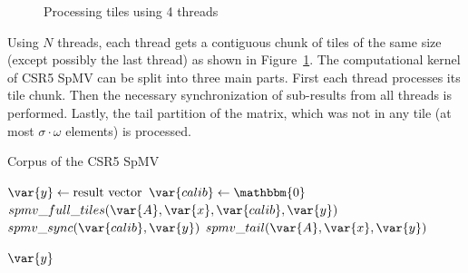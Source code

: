 \documentclass[thesis=M,english]{FITthesis}[2019/12/23]
\begin{document}
\begin{figure}[htp]
    \centering
    \caption{Processing tiles using 4 threads}\label{csr5:thr_dist}
\end{figure}

Using \(N\) threads, each thread gets a contiguous chunk of tiles of the same size (except possibly the
last thread) as shown in Figure~\ref{csr5:thr_dist}. The computational kernel of CSR5 SpMV can be split into three main parts. First each thread processes
its tile chunk. Then the necessary synchronization of sub-results from all threads is performed.
Lastly, the tail partition of the matrix, which was not in any tile (at most \(\sigma{} \cdot \omega\) elements)
is processed.

\begin{algorithm}[h]
    \caption{Corpus of the CSR5 SpMV}
    \begin{algorithmic}
        \State \(\var{y} \gets \text{result vector}\)
        \State \(\var{calib} \gets \mathbbm{0}\)
        \State \(spmv\_full\_tiles(\var{A}, \var{x}, \var{calib}, \var{y})\)
        \State \(spmv\_sync(\var{calib}, \var{y})\)
        \State \(spmv\_tail(\var{A}, \var{x}, \var{y})\)

        \Return $\var{y}$
        \EndFunction
    \end{algorithmic}
\end{algorithm}
\end{document}
